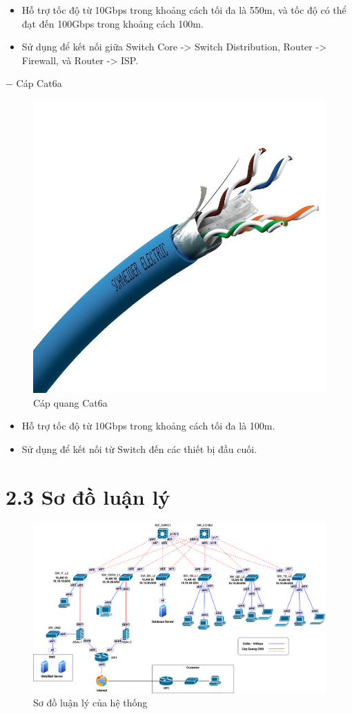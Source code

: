 \begin{itemize}[left=2cm]
    \item Hỗ trợ tốc độ từ 10Gbps trong khoảng cách tối đa là 550m, và tốc độ có thể đạt đến 100Gbps trong khoảng cách 100m.
    \item Sử dụng để kết nối giữa Switch Core -> Switch Distribution, Router -> Firewall, và Router -> ISP.
\end{itemize}

$-$ Cáp Cat6a
\begin{figure}[htbp]
    \centering    \includegraphics[width=0.5\linewidth]{img/cat6a.jpeg}
    \caption{Cáp quang Cat6a}
\end{figure}

\begin{itemize}[left=2cm]
    \item Hỗ trợ tốc độ từ 10Gbps trong khoảng cách tối đa là 100m.
    \item Sử dụng để kết nối từ Switch đến các thiết bị đầu cuối.
\end{itemize}

\section*{2.3 Sơ đồ luận lý}
\begin{figure}[htbp]
    \centering
    \includegraphics[width=1\linewidth]{img/logicFinalExam.png}
    \caption{Sơ đồ luận lý của hệ thống}
\end{figure}

